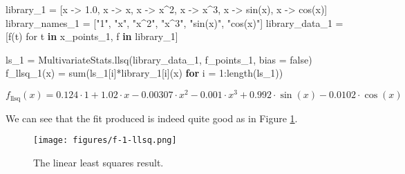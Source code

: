 \documentclass[
]{article}
\newenvironment{Shaded}{\begin{snugshade}}{\end{snugshade}}
\newcommand{\ConstantTok}[1]{\textcolor[rgb]{0.56,0.35,0.01}{#1}}
\newcommand{\ControlFlowTok}[1]{\textcolor[rgb]{0.00,0.23,0.31}{\textbf{#1}}}
\newcommand{\FloatTok}[1]{\textcolor[rgb]{0.68,0.00,0.00}{#1}}
\newcommand{\FunctionTok}[1]{\textcolor[rgb]{0.28,0.35,0.67}{#1}}
\newcommand{\KeywordTok}[1]{\textcolor[rgb]{0.00,0.23,0.31}{\textbf{#1}}}
\newcommand{\NormalTok}[1]{\textcolor[rgb]{0.00,0.23,0.31}{#1}}
\newcommand{\OperatorTok}[1]{\textcolor[rgb]{0.37,0.37,0.37}{#1}}
\newcommand{\StringTok}[1]{\textcolor[rgb]{0.13,0.47,0.30}{#1}}
\begin{document}
\begin{Shaded}
\begin{Highlighting}[]
\NormalTok{library\_1 }\OperatorTok{=}\NormalTok{ [x }\OperatorTok{{-}\textgreater{}} \FloatTok{1.0}\NormalTok{, x }\OperatorTok{{-}\textgreater{}}\NormalTok{ x, x }\OperatorTok{{-}\textgreater{}}\NormalTok{ x}\OperatorTok{\^{}}\FloatTok{2}\NormalTok{, x }\OperatorTok{{-}\textgreater{}}\NormalTok{ x}\OperatorTok{\^{}}\FloatTok{3}\NormalTok{, x }\OperatorTok{{-}\textgreater{}} \FunctionTok{sin}\NormalTok{(x), x }\OperatorTok{{-}\textgreater{}} \FunctionTok{cos}\NormalTok{(x)]}
\NormalTok{library\_names\_1 }\OperatorTok{=}\NormalTok{ [}\StringTok{"1"}\NormalTok{, }\StringTok{"x"}\NormalTok{, }\StringTok{"x\^{}2"}\NormalTok{, }\StringTok{"x\^{}3"}\NormalTok{, }\StringTok{"sin(x)"}\NormalTok{, }\StringTok{"cos(x)"}\NormalTok{]}
\NormalTok{library\_data\_1 }\OperatorTok{=}\NormalTok{ [}\FunctionTok{f}\NormalTok{(t) for t }\KeywordTok{in}\NormalTok{ x\_points\_1, f }\KeywordTok{in}\NormalTok{ library\_1]}

\NormalTok{ls\_1 }\OperatorTok{=}\NormalTok{ MultivariateStats.}\FunctionTok{llsq}\NormalTok{(library\_data\_1, f\_points\_1, bias }\OperatorTok{=} \ConstantTok{false}\NormalTok{)}
\FunctionTok{f\_llsq\_1}\NormalTok{(x) }\OperatorTok{=} \FunctionTok{sum}\NormalTok{(ls\_1[i]}\OperatorTok{*}\NormalTok{library\_1[i](x) }\ControlFlowTok{for}\NormalTok{ i }\OperatorTok{=} \FloatTok{1}\OperatorTok{:}\FunctionTok{length}\NormalTok{(ls\_1))}
\end{Highlighting}
\end{Shaded}

\begin{equation} \label{eq:f-simple-1-sparse}   f_{\text{llsq}}(x) = 0.124 \cdot 1 + 1.02 \cdot x -0.00307 \cdot x^{2} -0.001 \cdot x^{3} + 0.992 \cdot \sin\left( x \right) -0.0102 \cdot \cos\left( x \right) \end{equation}

We can see that the fit produced is indeed quite good as in Figure
\ref{fig:f-simple-llsq}.

\begin{figure}
    \centering
    \texttt{[image: figures/f-1-llsq.png]}
    \caption{The linear least squares result.}
    \label{fig:f-simple-llsq}
\end{figure}

\clearpage
\end{document}
